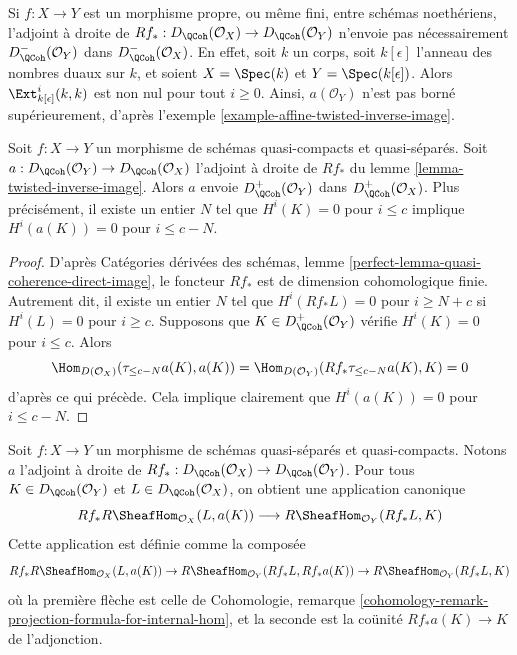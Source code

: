 \begin{example}
\label{example-does-not-preserve-bounded-above}
Si $f : X \to Y$ est un morphisme propre, ou même fini, entre schémas noethériens, l'adjoint à droite de $Rf_* : D_\QCoh(\mathcal{O}_X) \to D_\QCoh(\mathcal{O}_Y)$ n'envoie pas nécessairement $D_\QCoh^-(\mathcal{O}_Y)$ dans $D_\QCoh^-(\mathcal{O}_X)$. En effet, soit $k$ un corps, soit $k[\epsilon]$ l'anneau des nombres duaux sur $k$, et soient $X = \Spec(k)$ et $Y = \Spec(k[\epsilon])$. Alors $\Ext^i_{k[\epsilon]}(k, k)$ est non nul pour tout $i \geq 0$. Ainsi, $a(\mathcal{O}_Y)$ n'est pas borné supérieurement, d'après l'exemple \ref{example-affine-twisted-inverse-image}.
\end{example}

\begin{lemma}
\label{lemma-twisted-inverse-image-bounded-below}
Soit $f : X \to Y$ un morphisme de schémas quasi-compacts et quasi-séparés. Soit $a : D_\QCoh(\mathcal{O}_Y) \to D_\QCoh(\mathcal{O}_X)$ l'adjoint à droite de $Rf_*$ du lemme \ref{lemma-twisted-inverse-image}. Alors $a$ envoie $D^+_\QCoh(\mathcal{O}_Y)$ dans $D^+_\QCoh(\mathcal{O}_X)$. Plus précisément, il existe un entier $N$ tel que $H^i(K) = 0$ pour $i \leq c$ implique $H^i(a(K)) = 0$ pour $i \leq c - N$.
\end{lemma}

\begin{proof}
D'après Catégories dérivées des schémas, lemme \ref{perfect-lemma-quasi-coherence-direct-image}, le foncteur $Rf_*$ est de dimension cohomologique finie. Autrement dit, il existe un entier $N$ tel que $H^i(Rf_*L) = 0$ pour $i \geq N + c$ si $H^i(L) = 0$ pour $i \geq c$. Supposons que $K \in D^+_\QCoh(\mathcal{O}_Y)$ vérifie $H^i(K) = 0$ pour $i \leq c$. Alors
$$
\Hom_{D(\mathcal{O}_X)}(\tau_{\leq c - N}a(K), a(K)) =
\Hom_{D(\mathcal{O}_Y)}(Rf_*\tau_{\leq c - N}a(K), K) = 0
$$
d'après ce qui précède. Cela implique clairement que $H^i(a(K)) = 0$ pour $i \leq c - N$.
\end{proof}

\noindent
Soit $f : X \to Y$ un morphisme de schémas quasi-séparés et quasi-compacts. Notons $a$ l'adjoint à droite de $Rf_* : D_\QCoh(\mathcal{O}_X) \to D_\QCoh(\mathcal{O}_Y)$. Pour tous $K \in D_\QCoh(\mathcal{O}_Y)$ et $L \in D_\QCoh(\mathcal{O}_X)$, on obtient une application canonique
\begin{equation}
\label{equation-sheafy-trace}
Rf_*R\SheafHom_{\mathcal{O}_X}(L, a(K))
\longrightarrow
R\SheafHom_{\mathcal{O}_Y}(Rf_*L, K)
\end{equation}
Cette application est définie comme la composée
$$
Rf_*R\SheafHom_{\mathcal{O}_X}(L, a(K)) \to
R\SheafHom_{\mathcal{O}_Y}(Rf_*L, Rf_*a(K)) \to
R\SheafHom_{\mathcal{O}_Y}(Rf_*L, K)
$$
où la première flèche est celle de Cohomologie, remarque \ref{cohomology-remark-projection-formula-for-internal-hom}, et la seconde est la coünité $Rf_*a(K) \to K$ de l'adjonction.

